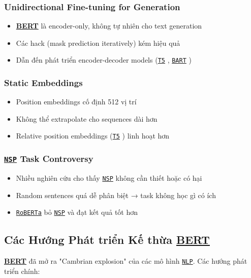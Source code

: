 \subsubsection{Unidirectional Fine-tuning for Generation}
\begin{itemize}
    \item \hyperref[acro:bert]{\textbf{BERT}} là encoder-only, không tự nhiên cho
    text generation
    \item Các hack (mask prediction iteratively) kém hiệu quả
    \item Dẫn đến phát triển encoder-decoder models (\hyperref[acro:t5]{\texttt{T5}} \cite{raffel2020exploring}, \hyperref[acro:bart]{\texttt{BART}} \cite{lewis2019bart})
\end{itemize}

\subsubsection{Static Embeddings}
\begin{itemize}
    \item Position embeddings cố định 512 vị trí
    \item Không thể extrapolate cho sequences dài hơn
    \item Relative position embeddings (\hyperref[acro:t5]{\texttt{T5}} \cite{raffel2020exploring}) linh hoạt hơn
\end{itemize}

\subsubsection{\hyperref[acro:nsp]{\texttt{NSP}} Task Controversy}
\begin{itemize}
    \item Nhiều nghiên cứu cho thấy \hyperref[acro:nsp]{\texttt{NSP}} không cần thiết hoặc có hại \cite{liu2019roberta}
    \item Random sentences quá dễ phân biệt → task không học gì có ích
    \item \hyperref[acro:roberta]{\texttt{RoBERTa}} \cite{liu2019roberta}
    bỏ \hyperref[acro:nsp]{\texttt{NSP}} và đạt kết quả tốt hơn
\end{itemize}

\subsection{Các Hướng Phát triển Kế thừa \hyperref[acro:bert]{\textbf{BERT}}}
\label{ssec:huong_phat_trien_ke_thua}
\hyperref[acro:bert]{\textbf{BERT}} đã mở ra "Cambrian explosion" của các mô hình \hyperref[acro:nlp]{\texttt{NLP}}.
Các hướng phát triển chính:

